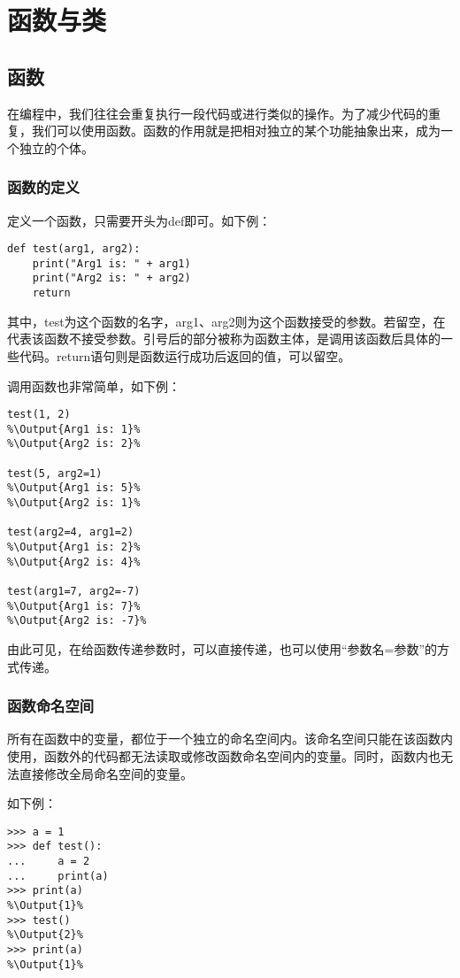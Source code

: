\section{函数与类\PyOnly }

\subsection{函数}
在编程中，我们往往会重复执行一段代码或进行类似的操作。为了减少代码的重复，我们可以使用函数。函数的作用就是把相对独立的某个功能抽象出来，成为一个独立的个体。

\subsubsection{函数的定义}
定义一个函数，只需要开头为def即可。如下例：
\begin{lstlisting}
def test(arg1, arg2):
    print("Arg1 is: " + arg1)
    print("Arg2 is: " + arg2)
    return
\end{lstlisting}

其中，test为这个函数的名字，arg1、arg2则为这个函数接受的参数。若留空，在代表该函数不接受参数。引号后的部分被称为函数主体，是调用该函数后具体的一些代码。return语句则是函数运行成功后返回的值，可以留空。

调用函数也非常简单，如下例：
\begin{lstlisting}
test(1, 2)
%\Output{Arg1 is: 1}%
%\Output{Arg2 is: 2}%

test(5, arg2=1)
%\Output{Arg1 is: 5}%
%\Output{Arg2 is: 1}%

test(arg2=4, arg1=2)
%\Output{Arg1 is: 2}%
%\Output{Arg2 is: 4}%

test(arg1=7, arg2=-7)
%\Output{Arg1 is: 7}%
%\Output{Arg2 is: -7}%
\end{lstlisting}

由此可见，在给函数传递参数时，可以直接传递，也可以使用“参数名=参数”的方式传递。

\subsubsection{函数命名空间}
所有在函数中的变量，都位于一个独立的命名空间内。该命名空间只能在该函数内使用，函数外的代码都无法读取或修改函数命名空间内的变量。同时，函数内也无法直接修改全局命名空间的变量。

如下例：
\begin{lstlisting}
>>> a = 1
>>> def test():
...     a = 2
...     print(a)
>>> print(a)
%\Output{1}%
>>> test()
%\Output{2}%
>>> print(a)
%\Output{1}%
\end{lstlisting}

